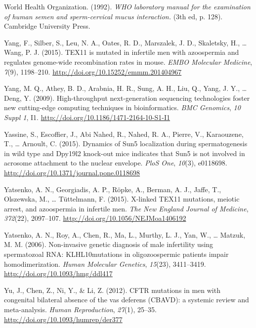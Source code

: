 \documentclass[12pt,twoside]{reedthesis}
\theoremstyle{definition}
\theoremstyle{definition}
\theoremstyle{remark}
\begin{document}
  \hypertarget{ref-WorldHealthOrganization1992}{}
  World Health Organization. (1992). \emph{WHO laboratory manual for the
  examination of human semen and sperm-cervical mucus interaction.} (3th
  ed, p. 128). Cambridge University Press.
  
  \hypertarget{ref-Yang2015}{}
  Yang, F., Silber, S., Leu, N. A., Oates, R. D., Marszalek, J. D.,
  Skaletsky, H., \ldots{} Wang, P. J. (2015). TEX11 is mutated in
  infertile men with azoospermia and regulates genome-wide recombination
  rates in mouse. \emph{EMBO Molecular Medicine}, \emph{7}(9), 1198--210.
  \url{http://doi.org/10.15252/emmm.201404967}
  
  \hypertarget{ref-Yang2009}{}
  Yang, M. Q., Athey, B. D., Arabnia, H. R., Sung, A. H., Liu, Q., Yang,
  J. Y., \ldots{} Deng, Y. (2009). High-throughput next-generation
  sequencing technologies foster new cutting-edge computing techniques in
  bioinformatics. \emph{BMC Genomics}, \emph{10 Suppl 1}, I1.
  \url{http://doi.org/10.1186/1471-2164-10-S1-I1}
  
  \hypertarget{ref-Yassine2015}{}
  Yassine, S., Escoffier, J., Abi Nahed, R., Nahed, R. A., Pierre, V.,
  Karaouzene, T., \ldots{} Arnoult, C. (2015). Dynamics of Sun5
  localization during spermatogenesis in wild type and Dpy19l2 knock-out
  mice indicates that Sun5 is not involved in acrosome attachment to the
  nuclear envelope. \emph{PloS One}, \emph{10}(3), e0118698.
  \url{http://doi.org/10.1371/journal.pone.0118698}
  
  \hypertarget{ref-Yatsenko2015}{}
  Yatsenko, A. N., Georgiadis, A. P., Röpke, A., Berman, A. J., Jaffe, T.,
  Olszewska, M., \ldots{} Tüttelmann, F. (2015). X-linked TEX11 mutations,
  meiotic arrest, and azoospermia in infertile men. \emph{The New England
  Journal of Medicine}, \emph{372}(22), 2097--107.
  \url{http://doi.org/10.1056/NEJMoa1406192}
  
  \hypertarget{ref-Yatsenko2006}{}
  Yatsenko, A. N., Roy, A., Chen, R., Ma, L., Murthy, L. J., Yan, W.,
  \ldots{} Matzuk, M. M. (2006). Non-invasive genetic diagnosis of male
  infertility using spermatozoal RNA: KLHL10mutations in oligozoospermic
  patients impair homodimerization. \emph{Human Molecular Genetics},
  \emph{15}(23), 3411--3419. \url{http://doi.org/10.1093/hmg/ddl417}
  
  \hypertarget{ref-Yu2012}{}
  Yu, J., Chen, Z., Ni, Y., \& Li, Z. (2012). CFTR mutations in men with
  congenital bilateral absence of the vas deferens (CBAVD): a systemic
  review and meta-analysis. \emph{Human Reproduction}, \emph{27}(1),
  25--35. \url{http://doi.org/10.1093/humrep/der377}
  
\end{document}
